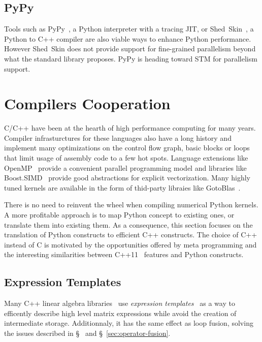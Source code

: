 \documentclass[10pt, preprint]{sigplanconf}
\begin{document}
\subsection{PyPy}
\cite{pypy2009}

Tools such as PyPy~\cite{pypy2009}, a Python interpreter with a tracing JIT, or
Shed~Skin~\cite{shedskin2006}, a Python to C++ compiler are also viable ways to
enhance Python performance. However Shed~Skin does not provide support for
fine-grained parallelism beyond what the standard library proposes. PyPy is
heading toward STM for parallelism support.

\section{Compilers Cooperation}
\label{sec:pythran}

C/C++ have been at the hearth of high performance computing for many years.
Compiler infrasturctures for these languages also have a long history and
implement many optimizations on the control flow graph, basic blocks or
loops~\cite{Aho2006} that limit usage of assembly code to a few hot spots.
Language extensions like OpenMP~\cite{openmp4} provide a convenient parallel
programming model and libraries like Boost.SIMD~\cite{boostsimd} provide good
abstractions for explicit vectorization. Many highly tuned kernels are
available in the form of thid-party libraies like GotoBlas~\cite{gotoblas2008}.

There is no need to reinvent the wheel when compiling numerical Python kernels.
A more profitable approach is to map Python concept to existing ones, or
translate them into existing them. As a consequence, this section focuses on
the translation of Python constructs to efficient C++ constructs. The choice of
C++ instead of C is motivated by the opportunities offered by meta programming
and the interesting similarities between C++11~\cite{isocxx11} features and
Python constructs.

\subsection{Expression Templates}
\label{sec:expression-templates}

Many C++ linear algebra libraries~\cite{eigen,ublas} use \emph{expression
templates}~\cite{expression_templates, et2012} as a way to efficently describe high
level matrix expressions while avoid the creation of intermediate storage.
Additionnaly, it has the same effect as loop fusion, solving the issues
described in \S~\cite{sec:temporaries-elimination} and
\S~\ref{sec:operator-fusion}.
\end{document}
